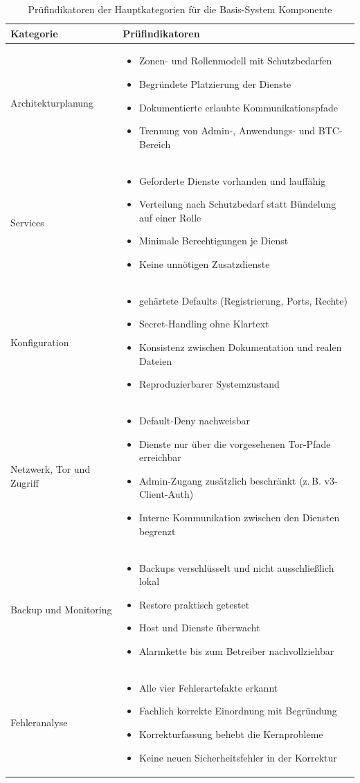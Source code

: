 \begin{table}[H]
\centering
\small
\newcommand{\indikatoren}[1]{\begin{itemize}[nosep,topsep=0pt,partopsep=0pt,leftmargin=1.2em]#1\end{itemize}}
\begin{tabular}{p{} p{}}
\hline
\textbf{Kategorie} & \textbf{Prüfindikatoren} \\
\hline
Architekturplanung &
\indikatoren{
\item Zonen- und Rollenmodell mit Schutzbedarfen
\item Begründete Platzierung der Dienste
\item Dokumentierte erlaubte Kommunikationspfade
\item Trennung von Admin-, Anwendungs- und \ac{BTC}-Bereich
} \\
\addlinespace
Services &
\indikatoren{
\item Geforderte Dienste vorhanden und lauffähig
\item Verteilung nach Schutzbedarf statt Bündelung auf einer Rolle
\item Minimale Berechtigungen je Dienst
\item Keine unnötigen Zusatzdienste
} \\
\addlinespace
Konfiguration &
\indikatoren{
\item gehärtete Defaults (Registrierung, Ports, Rechte)
\item Secret-Handling ohne Klartext
\item Konsistenz zwischen Dokumentation und realen Dateien
\item Reproduzierbarer Systemzustand
} \\
\addlinespace
Netzwerk, Tor und Zugriff &
\indikatoren{
\item Default-Deny nachweisbar
\item Dienste nur über die vorgesehenen Tor-Pfade erreichbar
\item Admin-Zugang zusätzlich beschränkt (z.\,B. v3-Client-Auth)
\item Interne Kommunikation zwischen den Diensten begrenzt
} \\
\addlinespace
Backup und Monitoring &
\indikatoren{
\item Backups verschlüsselt und nicht ausschließlich lokal
\item Restore praktisch getestet
\item Host und Dienste überwacht
\item Alarmkette bis zum Betreiber nachvollziehbar
} \\
\addlinespace
Fehleranalyse &
\indikatoren{
\item Alle vier Fehlerartefakte erkannt
\item Fachlich korrekte Einordnung mit Begründung
\item Korrekturfassung behebt die Kernprobleme
\item Keine neuen Sicherheitsfehler in der Korrektur
} \\
\hline
\end{tabular}
\caption{Prüfindikatoren der Hauptkategorien für die Basis-System Komponente}
\label{tab:kategorien-indikatoren}
\end{table}


